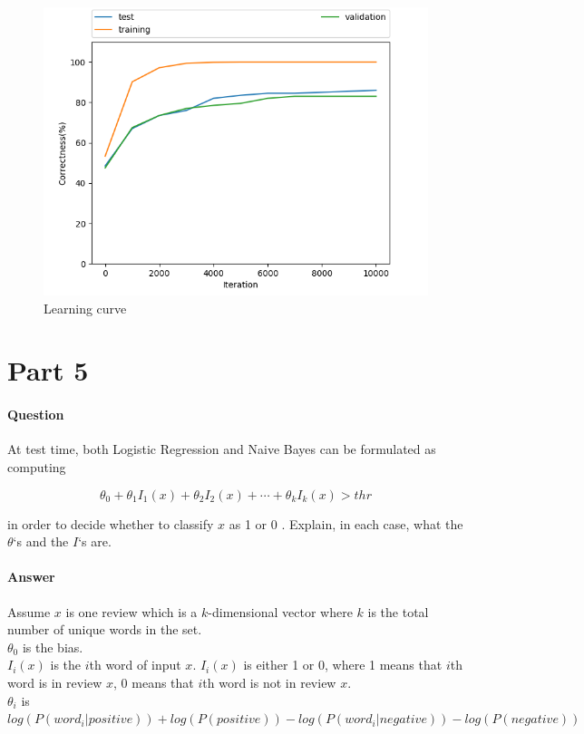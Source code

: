 \documentclass[11pt,twoside]{article}
\begin{document}
\begin{figure}[h]
	\centering
	\includegraphics[scale=0.8]{part4.png}
	\caption*{Learning curve}
\end{figure}

\clearpage

\section*{Part 5}
\paragraph{Question}
At test time, both Logistic Regression and Naive Bayes can be formulated as computing

\[\theta_0+\theta_1I_1(x)+\theta_2I_2(x)+\cdots+\theta_kI_k(x) > thr\]

in order to decide whether to classify $x$ as 1 or 0 . Explain, in each case, what the $\theta$‘s and the $I$‘s are.

\paragraph{Answer}
Assume $x$ is one review which is a $k$-dimensional vector where $k$ is the total number of unique words in the set.\\
$\theta_0$ is the bias.\\
$I_i(x)$ is the $i$th word of input $x$. $I_i(x)$ is either 1 or 0, where 1 means that $i$th word is in review $x$, 0 means that $i$th word is not in review $x$.\\
$\theta_i$ is $log(P(word_i | positive)) + log(P(positive)) - log(P(word_i | negative)) - log(P(negative))$
\clearpage
\end{document}

